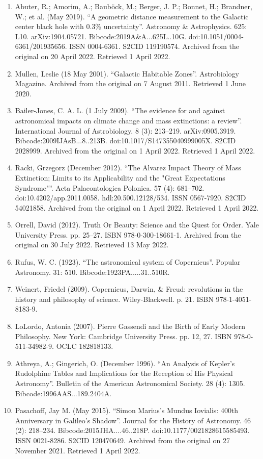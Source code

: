 \begin{enumerate}
\item Abuter, R.; Amorim, A.; Bauböck, M.; Berger, J. P.; Bonnet, H.; Brandner, W.; et al. (May 2019). ``A geometric distance measurement to the Galactic center black hole with 0.3\% uncertainty''. Astronomy \& Astrophysics. 625: L10. arXiv:1904.05721. Bibcode:2019A\&A...625L..10G. doi:10.1051/0004-6361/201935656. ISSN 0004-6361. S2CID 119190574. Archived from the original on 20 April 2022. Retrieved 1 April 2022.
\item Mullen, Leslie (18 May 2001). ``Galactic Habitable Zones''. Astrobiology Magazine. Archived from the original on 7 August 2011. Retrieved 1 June 2020.
\item Bailer-Jones, C. A. L. (1 July 2009). ``The evidence for and against astronomical impacts on climate change and mass extinctions: a review''. International Journal of Astrobiology. 8 (3): 213–219. arXiv:0905.3919. Bibcode:2009IJAsB...8..213B. doi:10.1017/S147355040999005X. S2CID 2028999. Archived from the original on 1 April 2022. Retrieved 1 April 2022.
\item Racki, Grzegorz (December 2012). ``The Alvarez Impact Theory of Mass Extinction; Limits to its Applicability and the "Great Expectations Syndrome"''. Acta Palaeontologica Polonica. 57 (4): 681–702. doi:10.4202/app.2011.0058. hdl:20.500.12128/534. ISSN 0567-7920. S2CID 54021858. Archived from the original on 1 April 2022. Retrieved 1 April 2022.
\item Orrell, David (2012). Truth Or Beauty: Science and the Quest for Order. Yale University Press. pp. 25–27. ISBN 978-0-300-18661-1. Archived from the original on 30 July 2022. Retrieved 13 May 2022.
\item Rufus, W. C. (1923). ``The astronomical system of Copernicus''. Popular Astronomy. 31: 510. Bibcode:1923PA.....31..510R.
\item Weinert, Friedel (2009). Copernicus, Darwin, \& Freud: revolutions in the history and philosophy of science. Wiley-Blackwell. p. 21. ISBN 978-1-4051-8183-9.
\item LoLordo, Antonia (2007). Pierre Gassendi and the Birth of Early Modern Philosophy. New York: Cambridge University Press. pp. 12, 27. ISBN 978-0-511-34982-9. OCLC 182818133.
\item Athreya, A.; Gingerich, O. (December 1996). ``An Analysis of Kepler's Rudolphine Tables and Implications for the Reception of His Physical Astronomy''. Bulletin of the American Astronomical Society. 28 (4): 1305. Bibcode:1996AAS...189.2404A.
\item Pasachoff, Jay M. (May 2015). ``Simon Marius's Mundus Iovialis: 400th Anniversary in Galileo's Shadow''. Journal for the History of Astronomy. 46 (2): 218–234. Bibcode:2015JHA....46..218P. doi:10.1177/0021828615585493. ISSN 0021-8286. S2CID 120470649. Archived from the original on 27 November 2021. Retrieved 1 April 2022.

\end{enumerate}
